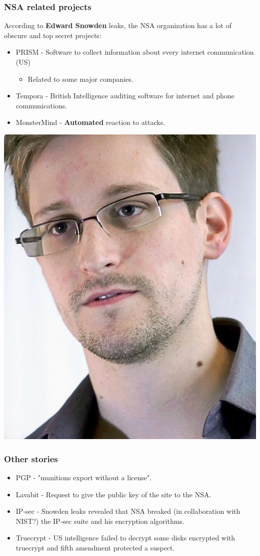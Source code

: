 \begin{frame}
	\frametitle{NSA related projects}
	According to \textbf{Edward Snowden} leaks, the NSA organization has a
	lot of obscure and top secret projects:
	\begin{itemize}
		\item PRISM - Software to collect information about every internet communication (US)
		\begin{itemize}
			\item Related to some major companies.
		\end{itemize}
		\item Tempora - British Intelligence auditing software for
			internet and phone communications.
		\item MonsterMind - \textbf{Automated} reaction to attacks.
	\end{itemize}
		\hfill\includegraphics[scale=0.1]{imgs/snowden}
\end{frame}

\begin{frame}
	\frametitle{Other stories}
	\begin{itemize}
		\item PGP - "munitions export without a license".
		\item Lavabit - Request to give the public key of the site to
		the NSA.
		\item IP-sec - Snowden leaks revealed that NSA breaked (in
		collaboration with NIST?) the IP-sec suite and his encryption
		algorithms.
		\item Truecrypt - US intelligence failed to decrypt some disks
		encrypted with truecrypt and fifth amendment protected a suspect.
	\end{itemize}
\end{frame}

